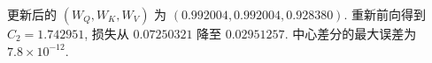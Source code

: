 更新后的 $(W_Q,W_K,W_V)$ 为 $(0.992004,0.992004,0.928380)$. 重新前向得到 $C_2=1.742951$, 损失从 $0.07250321$ 降至 $0.02951257$. 中心差分的最大误差为 $7.8\times10^{-12}$.
